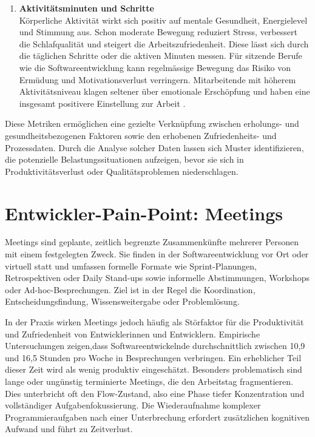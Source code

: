 \documentclass[12pt,a4paper]{report}
\begin{document}
\begin{enumerate}
  \item \textbf{Aktivitätsminuten und Schritte}\\
        Körperliche Aktivität wirkt sich positiv auf mentale Gesundheit, Energielevel und Stimmung aus. Schon moderate Bewegung
        reduziert Stress, verbessert die Schlafqualität und steigert die Arbeitszufriedenheit. Diese lässt sich durch die täglichen
        Schritte oder die aktiven Minuten messen. Für sitzende Berufe wie die Softwareentwicklung kann regelmässige Bewegung das
        Risiko von Ermüdung und Motivationsverlust verringern. Mitarbeitende mit höherem Aktivitätsniveau klagen seltener über
        emotionale Erschöpfung und haben eine insgesamt positivere Einstellung zur Arbeit \cite{dallmeyer_activity_2023}.
\end{enumerate}


Diese Metriken ermöglichen eine gezielte Verknüpfung zwischen erholungs- und gesundheitsbezogenen Faktoren sowie den erhobenen
Zufriedenheits- und Prozessdaten. Durch die Analyse solcher Daten lassen sich Muster identifizieren, die potenzielle
Belastungssituationen aufzeigen, bevor sie sich in Produktivitätsverlust oder Qualitätsproblemen niederschlagen. 


\section{Entwickler-Pain-Point: Meetings}

    Meetings sind geplante, zeitlich begrenzte Zusammenkünfte mehrerer Personen mit einem festgelegten Zweck. Sie finden in
    der Softwareentwicklung vor Ort oder virtuell statt und umfassen formelle Formate wie Sprint-Planungen, Retrospektiven
    oder Daily Stand-ups sowie informelle Abstimmungen, Workshops oder Ad-hoc-Besprechungen. Ziel ist in der Regel die
    Koordination, Entscheidungsfindung, Wissensweitergabe oder Problemlösung.

    In der Praxis wirken Meetings jedoch häufig als Störfaktor für die Produktivität und Zufriedenheit von Entwicklerinnen
    und Entwicklern. Empirische Untersuchungen zeigen,dass Softwareentwickelnde durchschnittlich zwischen 10,9 und 16,5
    Stunden pro Woche in Besprechungen verbringen. Ein erheblicher Teil
    dieser Zeit wird als wenig produktiv eingeschätzt. Besonders problematisch sind lange oder ungünstig terminierte Meetings,
    die den Arbeitstag fragmentieren. Dies unterbricht oft den Flow-Zustand, also eine Phase tiefer Konzentration
    und vollständiger Aufgabenfokussierung. Die Wiederaufnahme komplexer Programmieraufgaben nach einer Unterbrechung erfordert
    zusätzlichen kognitiven Aufwand und führt zu Zeitverlust. \cite{stray_understanding_2020, meyer_today_2021}
\end{document}
